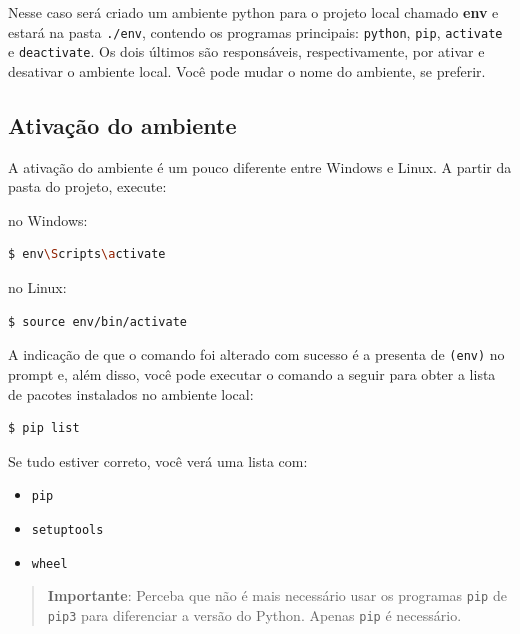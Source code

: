 \documentclass[brazil,a4paper,oneside,openright,parskip=full]{book}
\newcommand{\passthrough}[1]{#1}
\providecommand{\tightlist}{%
  \setlength{\itemsep}{0pt}\setlength{\parskip}{0pt}}
\begin{document}
Nesse caso será criado um ambiente python para o projeto local chamado
\textbf{env} e estará na pasta \passthrough{\lstinline!./env!}, contendo
os programas principais: \passthrough{\lstinline!python!},
\passthrough{\lstinline!pip!}, \passthrough{\lstinline!activate!} e
\passthrough{\lstinline!deactivate!}. Os dois últimos são responsáveis,
respectivamente, por ativar e desativar o ambiente local. Você pode
mudar o nome do ambiente, se preferir.

\hypertarget{ativauxe7uxe3o-do-ambiente}{%
\subsection{Ativação do ambiente}\label{ativauxe7uxe3o-do-ambiente}}

A ativação do ambiente é um pouco diferente entre Windows e Linux. A
partir da pasta do projeto, execute:

no Windows:

\begin{lstlisting}[language=sh, style=nonumber]
$ env\Scripts\activate
\end{lstlisting}

no Linux:

\begin{lstlisting}[language=sh, style=nonumber]
$ source env/bin/activate
\end{lstlisting}

A indicação de que o comando foi alterado com sucesso é a presenta de
\passthrough{\lstinline!(env)!} no prompt e, além disso, você pode
executar o comando a seguir para obter a lista de pacotes instalados no
ambiente local:

\begin{lstlisting}[language=sh, style=nonumber]
$ pip list
\end{lstlisting}

Se tudo estiver correto, você verá uma lista com:

\begin{itemize}
\tightlist
\item
  \passthrough{\lstinline!pip!}
\item
  \passthrough{\lstinline!setuptools!}
\item
  \passthrough{\lstinline!wheel!}
\end{itemize}

\begin{quote}
\textbf{Importante}: Perceba que não é mais necessário usar os programas
\passthrough{\lstinline!pip!} de \passthrough{\lstinline!pip3!} para
diferenciar a versão do Python. Apenas \passthrough{\lstinline!pip!} é
necessário.
\end{quote}
\end{document}
